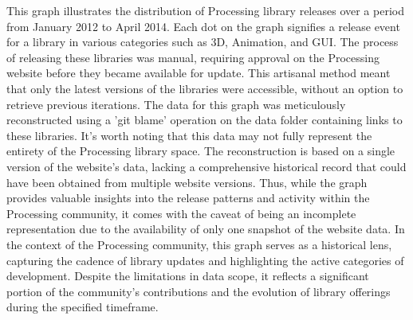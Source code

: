 \begin{multicols}{3}
	\noindent
	This graph illustrates the distribution of Processing library releases over a period from January 2012 to April 2014. Each dot on the graph signifies a release event for a library in various categories such as 3D, Animation, and GUI. The process of releasing these libraries was manual, requiring approval on the Processing website before they became available for update. This artisanal method meant that only the latest versions of the libraries were accessible, without an option to retrieve previous iterations.
	\noindent
	The data for this graph was meticulously reconstructed using a 'git blame' operation on the data folder containing links to these libraries. It's worth noting that this data may not fully represent the entirety of the Processing library space. The reconstruction is based on a single version of the website's data, lacking a comprehensive historical record that could have been obtained from multiple website versions. Thus, while the graph provides valuable insights into the release patterns and activity within the Processing community, it comes with the caveat of being an incomplete representation due to the availability of only one snapshot of the website data.
\noindent	
	In the context of the Processing community, this graph serves as a historical lens, capturing the cadence of library updates and highlighting the active categories of development. Despite the limitations in data scope, it reflects a significant portion of the community's contributions and the evolution of library offerings during the specified timeframe.	
\end{multicols}
